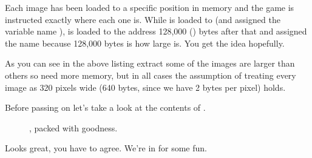 Each image has been loaded to a specific position in memory and the game is instructed exactly where each one is. While 
is loaded to  (and assigned the variable name ),  is loaded to the address 128,000 () 
bytes after that and assigned the name  because 128,000 bytes is how large  is. You get the idea hopefully. 

As you can see in the above listing extract some of the images are larger than others so need more memory, but in all cases the assumption of treating every image as 320 pixels wide 
(640 bytes, since we have 2 bytes per pixel) holds.

Before passing on let's take a look at the contents of . 

\begin{figure}[H]
    \centering
    \begin{adjustbox}{width=8cm,center}
    \end{adjustbox}
  \caption{, packed with goodness.}
\end{figure}

Looks great, you have to agree. We're in for some fun.


